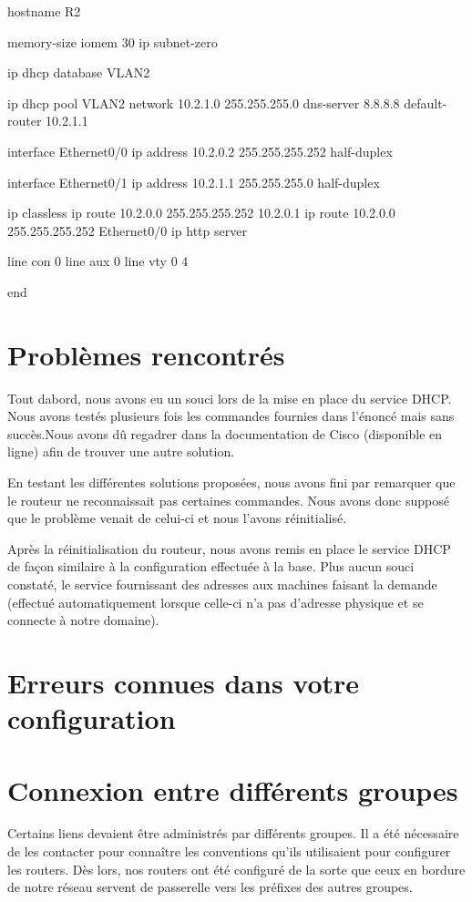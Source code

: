 \documentclass{article}
\begin{document}
hostname R2

memory-size iomem 30
ip subnet-zero

ip dhcp database VLAN2

ip dhcp pool VLAN2
   network 10.2.1.0 255.255.255.0
   dns-server 8.8.8.8
   default-router 10.2.1.1

interface Ethernet0/0
 ip address 10.2.0.2 255.255.255.252
 half-duplex

interface Ethernet0/1
 ip address 10.2.1.1 255.255.255.0
 half-duplex

ip classless
ip route 10.2.0.0 255.255.255.252 10.2.0.1
ip route 10.2.0.0 255.255.255.252 Ethernet0/0
ip http server

line con 0
line aux 0
line vty 0 4

end

\section{Problèmes rencontrés}

Tout dabord, nous avons eu un souci lors de la mise en place du service DHCP. Nous avons testés
plusieurs fois les commandes fournies dans l'énoncé mais sans succès.Nous avons dû regadrer dans
la documentation de Cisco (disponible en ligne) afin de trouver une autre solution.

En testant les différentes solutions proposées, nous avons fini par remarquer que le routeur
ne reconnaissait pas certaines commandes. Nous avons donc supposé que le problème venait de celui-ci
et nous l'avons réinitialisé.

Après la réinitialisation du routeur, nous avons remis en place le service DHCP de façon similaire
à la configuration effectuée à la base. Plus aucun souci constaté, le service fournissant des adresses
aux machines faisant la demande (effectué automatiquement lorsque celle-ci n'a pas d'adresse physique et se connecte à notre domaine).
\section{Erreurs connues dans votre configuration}

\section{Connexion entre différents groupes}

Certains liens devaient être administrés par différents groupes. Il a été nécessaire de les contacter pour connaître les conventions qu'ils utilisaient pour configurer les routers. Dès lors, nos routers ont été configuré de la sorte que ceux en bordure de notre réseau servent de passerelle vers les préfixes des autres groupes.
\end{document}
